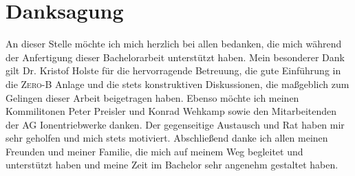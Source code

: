 \chapter*{Danksagung}
An dieser Stelle möchte ich mich herzlich bei allen bedanken, die mich während der Anfertigung dieser Bachelorarbeit unterstützt haben. Mein besonderer Dank gilt Dr. Kristof Holste für die hervorragende Betreuung, die gute Einführung in die \textsc{Zero-B} Anlage und die stets konstruktiven Diskussionen, die maßgeblich zum Gelingen dieser Arbeit beigetragen haben. Ebenso möchte ich meinen Kommilitonen Peter Preisler und Konrad Wehkamp sowie den Mitarbeitenden der AG Ionentriebwerke danken. Der gegenseitige Austausch und Rat haben mir sehr geholfen und mich stets motiviert. Abschließend danke ich allen meinen Freunden und meiner Familie, die mich auf meinem Weg begleitet und unterstützt haben und meine Zeit im Bachelor sehr angenehm gestaltet haben.